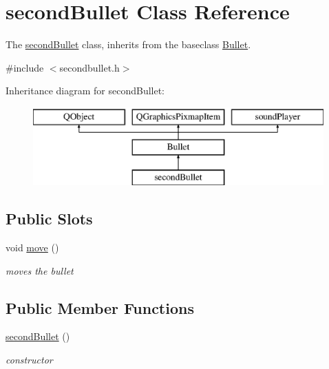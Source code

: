 \hypertarget{classsecondBullet}{}\section{second\+Bullet Class Reference}
\label{classsecondBullet}


The \hyperlink{classsecondBullet}{second\+Bullet} class, inherits from the baseclass \hyperlink{classBullet}{Bullet}.  




{\ttfamily \#include $<$secondbullet.\+h$>$}

Inheritance diagram for second\+Bullet\+:\begin{figure}[H]
\begin{center}
\leavevmode
\includegraphics[height=3.000000cm]{classsecondBullet}
\end{center}
\end{figure}
\subsection*{Public Slots}
\begin{DoxyCompactItemize}
\item 
\mbox{\label{classsecondBullet_a81df90840307b5ec6d28a9559ce5335d}} 
void \hyperlink{classsecondBullet_a81df90840307b5ec6d28a9559ce5335d}{move} ()
\begin{DoxyCompactList}\small\item\em moves the bullet \end{DoxyCompactList}\end{DoxyCompactItemize}
\subsection*{Public Member Functions}
\begin{DoxyCompactItemize}
\item 
\mbox{\label{classsecondBullet_a10822241539609e1a25f5dcae583b96b}} 
\hyperlink{classsecondBullet_a10822241539609e1a25f5dcae583b96b}{second\+Bullet} ()
\begin{DoxyCompactList}\small\item\em constructor \end{DoxyCompactList}\end{DoxyCompactItemize}


